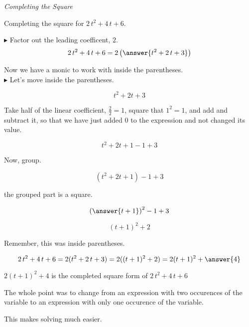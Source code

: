 \documentclass{ximera}
\begin{document}
\begin{procedure} \textit{Completing the Square}



Completing the square for $2 \, t^2 + 4 \, t + 6$.


\begin{explanation}

$\blacktriangleright$ Factor out the leading coefficent, $2$.\\

\[     2 \, t^2 + 4 \, t + 6 = 2 \left( \answer{t^2 + 2 \, t + 3} \right)   \] 


Now we have a monic to work with inside the parentheses. \\


$\blacktriangleright$ Let's move inside the parentheses.

\[ t^2 + 2 t + 3 \]

Take half of the linear coefficient, $\frac{2}{2} = 1$, square that $1^2 = 1$, and add and subtract it, so that we have just added $0$ to the expression and not changed its value.


\[ t^2 + 2 t + 1 - 1 +3 \]


Now, group.

\[ (t^2 + 2 t + 1)- 1 +3 \]

the grouped part is a square.

\[ \left( \answer{t+1} \right)^2- 1 +3 \]

\[ (t+1)^2 + 2 \]

Remember, this was inside parentheses.

\[     2 \, t^2 + 4 \, t + 6 = 2 (t^2 + 2 \, t + 3)  = 2 ((t+1)^2 + 2) =  2 (t+1)^2 + \answer{4}\] 


$2 (t+1)^2 + 4$ is the completed square form of $2 \, t^2 + 4 \, t + 6$

\end{explanation}



\end{procedure}


The whole point was to change from an expression with two occurences of the variable to an expression with only one occurence of the variable.

This makes solving much easier.
\end{document}
